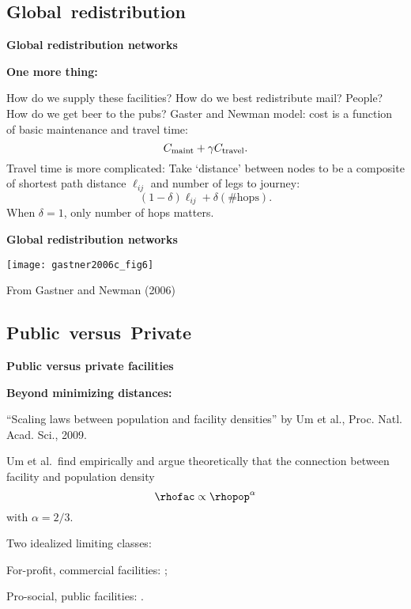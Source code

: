   


\subsection{Global\ redistribution}

  \textbf{Global redistribution networks}

  \textbf{One more thing:}
    
     How do we supply these facilities?
     How do we best redistribute mail?  People?
     How do we get beer to the pubs?
     Gaster and Newman model: cost is 
      a function of basic maintenance and travel time:
      $$
      C_{\textnormal{maint}} + \gamma C_{\textnormal{travel}}.
      $$
     Travel time is more complicated:
      Take `distance' between nodes to be a composite
      of shortest path distance $\ell_{ij}$ and 
      number of legs to journey:
      $$
      (1-\delta) \ell_{ij} + \delta (\# \mbox{hops}).
      $$
     When $\delta=1$, only number of hops matters.
      
      
    
  


  \textbf{Global redistribution networks}

  \texttt{[image: gastner2006c\_fig6]}

  From Gastner and Newman (2006)\cite{gastner2006c}

\subsection{Public\ versus\ Private}

  \textbf{Public versus private facilities}

  \textbf{Beyond minimizing distances:}
    
    
      ``Scaling laws between population and facility densities'' by
      Um et al., Proc. Natl. Acad. Sci., 2009.\cite{um2009a}
    
      Um et al.\ find empirically and argue theoretically that the connection
      between facility and population density
      $$
      \rhofac \propto \rhopop^{\alpha}
      $$
       with $\alpha=2/3$.
    
      \alert{Two idealized limiting classes}:
      
      
        For-profit, commercial facilities: ;
      
        Pro-social, public facilities: .
      
